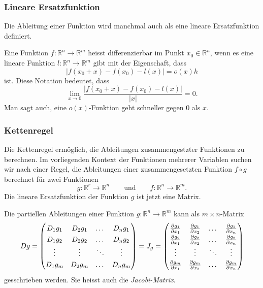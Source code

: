 %
%
\subsubsection{Lineare Ersatzfunktion}

Die Ableitung einer Funktion wird manchmal auch als eine lineare
Ersatzfunktion definiert.

\begin{definition}
Eine Funktion $f\colon\mathbb{R}^n\to\mathbb{R}^m$ heisst differenzierbar
im Punkt $x_0\in\mathbb{R}^n$, wenn es eine lineare Funktion
$l\colon \mathbb{R}^n\to\mathbb{R}^m$ gibt mit der Eigenschaft, dass
\[
|f(x_0+x) - f(x_0) - l(x)| = o(x)h
\]
ist.
Diese Notation bedeutet, dass
\[
\lim_{x\to 0}
\frac{|f(x_0+x)-f(x_0)-l(x)|}{|x|}
=
0.
\]
Man sagt auch, eine $o(x)$-Funktion geht schneller gegen $0$ als $x$.
\end{definition}

%
%
\subsubsection{Kettenregel}
Die Kettenregel ermöglich, die Ableitungen zusammengestzter Funktionen
zu berechnen.
Im vorliegenden Kontext der Funktionen mehrerer Variablen suchen
wir nach einer Regel, die Ableitungen einer zusammengesetzten Funktion
$f\circ g$ berechnet für zwei Funktionen
\[
g\colon \mathbb{R}^r\to\mathbb{R}^n
\qquad\text{und}\qquad
f\colon \mathbb{R}^n\to\mathbb{R}^m.
\]
Die lineare Ersatzfunktion der Funktion $g$ ist jetzt eine Matrix.

\begin{definition}
\label{buch:fuvar:richtungsableitung:def:ableitungsmatrix}
Die partiellen Ableitungen einer Funktion
$g\colon\mathbb{R}^n\to\mathbb{R}^m$
kann als $m\times n$-Matrix
\[
Dg
=
\begin{pmatrix}
D_1g_1 & D_2g_1 & \dots  & D_ng_1 \\
D_1g_2 & D_2g_2 & \dots  & D_ng_2 \\
\vdots & \vdots & \ddots & \vdots \\
D_1g_m & D_2g_m & \dots  & D_ng_m
\end{pmatrix}
=
J_g
=
{\renewcommand{\arraystretch}{1.3}
\begin{pmatrix}
\frac{\partial g_1}{\partial x_1}
	& \frac{\partial g_1}{\partial x_2}
		&\dots
			&\frac{\partial g_1}{\partial x_n}
\\
\frac{\partial g_2}{\partial x_1}
	& \frac{\partial g_2}{\partial x_2}
		&\dots
			&\frac{\partial g_2}{\partial x_n}
\\
\vdots	&\vdots	&\ddots	&\vdots \\
\frac{\partial g_m}{\partial x_1}
	& \frac{\partial g_m}{\partial x_2}
		&\dots
			&\frac{\partial g_m}{\partial x_n}
\end{pmatrix}}
\]
gesschrieben werden.
Sie heisst auch die {\em Jacobi-Matrix}.
%
\end{definition}

